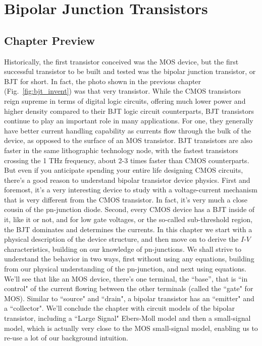 \chapter{Bipolar Junction Transistors}
\graphicspath{{./figs_bjt/}}
\section{Chapter Preview}
Historically, the first transistor conceived was the MOS device, but the first successful transistor to be built and tested was the bipolar junction transistor, or BJT for short.  In fact, the photo shown in the previous chapter (Fig.~\ref{fig:bjt_invent}) was that very transistor.  While the CMOS transistors reign supreme in terms of digital logic circuits, offering much lower power and higher density compared to their BJT logic circuit counterparts, BJT transistors continue to play an important role in many applications.  For one, they generally have better current handling capability as currents flow through the bulk of the device, as opposed to the surface of an MOS transistor.  BJT transistors are also faster in the same lithographic technology node, with the fastest transistors crossing the 1 THz frequency, about 2-3 times faster than CMOS counterparts.  But even if you anticipate spending your entire life designing CMOS circuits, there's a good reason to understand bipolar transistor device physics.  First and foremost, it's a very interesting device to study with a voltage-current mechanism that is very different from the CMOS transistor.  In fact, it's very much a close cousin of the pn-junction diode.  Second, every CMOS device has a BJT inside of it, like it or not, and for low gate voltages, or the so-called sub-threshold region, the BJT dominates and determines the currents.  
In this chapter we start with a physical description of the device structure, and then move on to derive the $I$-$V$ characteristics, building on our knowledge of pn-junctions. We shall strive to understand the behavior in two ways, first without using any equations, building from our physical understanding of the pn-junction, and next using equations.  We'll see that like an MOS device, there's one terminal, the ``base'', that is ``in control" of the current flowing between the other terminals (called the ``gate" for MOS).  Similar to ``source" and ``drain", a bipolar transistor has an ``emitter" and a ``collector".   We'll conclude the chapter with circuit models of the bipolar transistor, including a ``Large Signal" Ebers-Moll model and then a small-signal model, which is actually very close to the MOS small-signal model, enabling us to re-use a lot of our background intuition.
